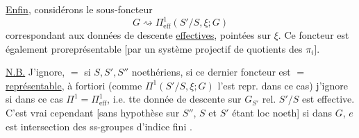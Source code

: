 \uline{Enfin}, considérons le sous-foncteur
\[
G\rightsquigarrow \Pi^1_{\mathrm{eff}}(S'/S,\xi;G)
\]
correspondant aux données de descente \uline{effectives}, pointées sur $\xi$.
Ce foncteur est également proreprésentable
[par un système projectif de quotients des $\pi_i$].

\uline{N.B.} J'ignore, $=$ si $S,S',S''$ noethériens, si ce dernier foncteur
est $=$ \uline{représentable}, à fortiori
(comme $\Pi^1(S'/S,\xi;G)$ l'est repr. dans ce cas)
j'ignore si dans ce cas $\Pi^1=\Pi^1_{\mathrm{eff}}$, i.e. tte
donnée de descente sur $G_{S'}$ rel. $S'/S$ est effective.
C'est vrai cependant [sans hypothèse sur $S''$, $S$ et $S'$
étant loc noeth] si  dans $G$,
$e$ est intersection des ss-groupes d'indice fini \unsure{-----}.

